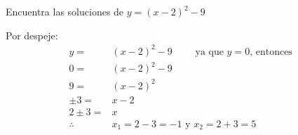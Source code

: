 Encuentra las soluciones de $y=(x-2)^2-9$

\begin{solutionbox}{5cm}
    Por despeje:
    \begin{align*}
        y=         & (x-2)^2-9  \qquad \text{ ya que $y=0$, entonces } \\
        0=         & (x-2)^2-9                                         \\
        9=         & (x-2)^2                                           \\
        \pm 3=     & x-2                                               \\
        2 \pm 3=   & x                                                 \\
        \therefore & x_1=2-3 =-1 \text{ y } x_2=2+3=5
    \end{align*}
\end{solutionbox}
